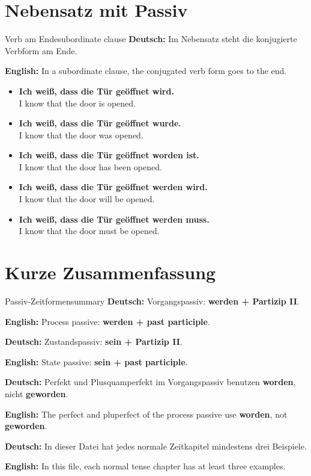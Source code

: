 \documentclass[a4paper,11pt]{article}
\newcommand{\GermanText}[1]{\textbf{Deutsch: }#1\par}
\newcommand{\EnglishText}[1]{{\small\color{SoftGray}\textbf{English: }#1\par}}
\newcommand{\ExampleItem}[2]{\item \textbf{#1}\\{\small\color{SoftGray}#2}}
\begin{document}
\section{Nebensatz mit Passiv}

\begin{grammarentry}{Verb am Ende}{subordinate clause}
\GermanText{Im Nebensatz steht die konjugierte Verbform am Ende.}
\EnglishText{In a subordinate clause, the conjugated verb form goes to the end.}

\begin{exbox}
\begin{itemize}
    \ExampleItem{Ich weiß, dass die Tür geöffnet wird.}{I know that the door is opened.}
    \ExampleItem{Ich weiß, dass die Tür geöffnet wurde.}{I know that the door was opened.}
    \ExampleItem{Ich weiß, dass die Tür geöffnet worden ist.}{I know that the door has been opened.}
    \ExampleItem{Ich weiß, dass die Tür geöffnet werden wird.}{I know that the door will be opened.}
    \ExampleItem{Ich weiß, dass die Tür geöffnet werden muss.}{I know that the door must be opened.}
\end{itemize}
\end{exbox}
\end{grammarentry}

\section{Kurze Zusammenfassung}

\begin{grammarentry}{Passiv-Zeitformen}{summary}
\GermanText{Vorgangspassiv: \textbf{werden + Partizip II}.}
\EnglishText{Process passive: \textbf{werden + past participle}.}

\GermanText{Zustandspassiv: \textbf{sein + Partizip II}.}
\EnglishText{State passive: \textbf{sein + past participle}.}

\GermanText{Perfekt und Plusquamperfekt im Vorgangspassiv benutzen \textbf{worden}, nicht \textbf{geworden}.}
\EnglishText{The perfect and pluperfect of the process passive use \textbf{worden}, not \textbf{geworden}.}

\GermanText{In dieser Datei hat jedes normale Zeitkapitel mindestens drei Beispiele.}
\EnglishText{In this file, each normal tense chapter has at least three examples.}
\end{grammarentry}
\end{document}
